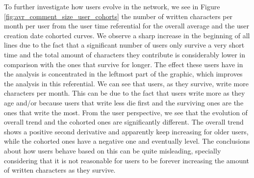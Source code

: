 To further investigate how users evolve in the network, we see in Figure \ref{fig:avr_comment_size_user_cohorts} the number of written characters per month per user from the user time referential for the overall average and the user creation date cohorted curves. We observe a sharp increase in the beginning of all lines due to the fact that a significant number of users only survive a very short time and the total amount of characters they contribute is considerably lower in comparison with the ones that survive for longer. The effect these users have in the analysis is concentrated in the leftmost part of the graphic, which improves the analysis in this referential. We can see that users, as they survive, write more characters per month. This can be due to the fact that users write more as they age and/or because users that write less die first and the surviving ones are the ones that write the most. From the user perspective, we see that the evolution of overall trend and the cohorted ones are significantly different. The overall trend shows a positive second derivative and apparently keep increasing for older users, while the cohorted ones have a negative one and eventually level. The conclusions about how users behave based on this can be quite misleading, specially considering that it is not reasonable for users to be forever increasing the amount of written characters as they survive.

